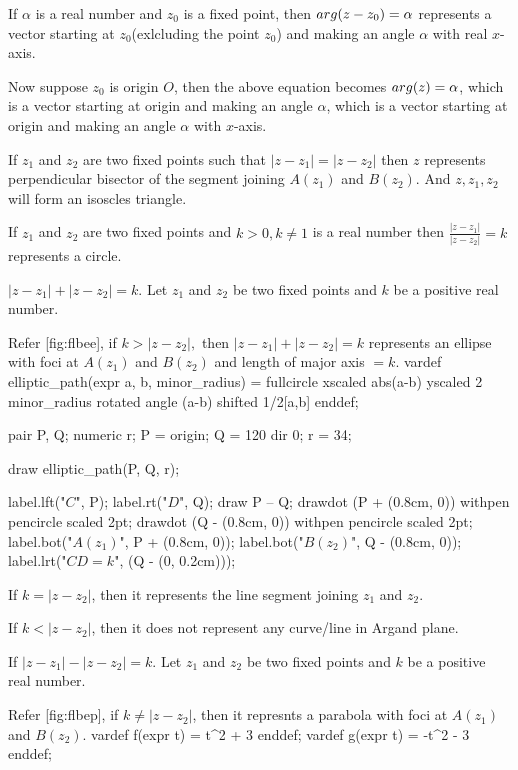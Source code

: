   If $\alpha$ is a real number and $z_0$ is a fixed point, then $\\arg(z - z_0) =\alpha$ represents a vector starting at
  $z_0$(exlcluding  the point $z_0$) and making an angle $\alpha$ with real $x$-axis.

  \startplacefigure
  \stopplacefigure

  Now suppose $z_0$ is origin $O$, then the above equation becomes $\\arg(z) = \alpha$, which is a vector starting at origin and
  making an angle $\alpha$, which is a vector starting at origin and making an angle $\alpha$ with $x$-axis.
\item If $z_1$ and $z_2$ are two fixed points such that $|z - z_1| = |z - z_2|$ then $z$ represents perpendicular bisector of the
  segment joining $A(z_1)$ and $B(z_2).$ And $z, z_1, z_2$ will form an isoscles triangle.
  \startplacefigure
  \stopplacefigure

  If $z_1$ and $z_2$ are two fixed points and $k > 0, k\neq 1$ is a real number then $\frac{|z- z_1|}{|z - z_2|} = k$ represents a
  circle.

\item $|z - z_1| + |z - z_2| = k$. Let $z_1$ and $z_2$ be two fixed points and $k$ be a positive real number.
  \startitemize[i]
  \item Refer [fig:flbee], if $k > |z - z_2|,$ then $|z - z_1| + |z - z_2| = k$ represents an ellipse with foci at $A(z_1)$ and $B(z_2)$ and length
    of major axis $= k$.
    \startplacefigure[title={Locus of an Ellipse}, reference=fig:flbee]
      \startMPcode
        vardef elliptic_path(expr a, b, minor_radius) =
          fullcircle xscaled abs(a-b) yscaled 2 minor_radius
               rotated angle (a-b) shifted 1/2[a,b]
        enddef;

        pair P, Q; numeric r;
        P = origin; Q = 120 dir 0;
        r = 34;

        draw elliptic_path(P, Q, r);

        label.lft("$C$", P);
        label.rt("$D$", Q);
        draw P -- Q;
        drawdot (P + (0.8cm, 0)) withpen pencircle scaled 2pt;
        drawdot (Q - (0.8cm, 0)) withpen pencircle scaled 2pt;
        label.bot("$A(z_1)$", P + (0.8cm, 0));
        label.bot("$B(z_2)$", Q - (0.8cm, 0));
        label.lrt("$CD = k$", (Q - (0, 0.2cm)));
      \stopMPcode
    \stopplacefigure
  \item If $k = |z - z_2|$, then it represents the line segment joining $z_1$ and $z_2$.
  \item If $k < |z - z_2|$, then it does not represent any curve/line in Argand plane.
  \stopitemize
\item If $|z - z_1| - |z - z_2| = k$. Let $z_1$ and $z_2$ be two fixed points and $k$ be a positive real number.
  \startitemize[i]
  \item Refer [fig:flbep], if $k\neq |z - z_2|$, then it represnts a parabola with foci at $A(z_1)$ and $B(z_2)$.
    \startplacefigure[title={Locus of a Parabola}, reference=fig:flbep]
      \startMPcode
        vardef f(expr t) = t^2 + 3 enddef;
        vardef g(expr t) =  -t^2 - 3 enddef;

